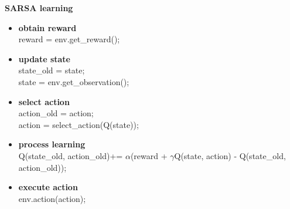 \documentclass[xcolor=dvipsnames]{beamer}
\begin{document}
\begin{frame}{\bf SARSA learning}

\begin{itemize}
  \item {\color{red} \bf obtain reward} \\
        reward = env.get\_reward();

  \item {\color{red} \bf update state} \\
        state\_old = state; \\
        state = env.get\_observation(); \\

  \item {\color{red} \bf select action} \\
        action\_old = action; \\
        action = select\_action(Q(state)); \\

  \item {\color{red} \bf process learning} \\
    Q(state\_old, action\_old)+= $\alpha$(reward + $\gamma$Q(state, action) - Q(state\_old, action\_old));

  \item {\color{red} \bf execute action} \\
    env.action(action);

\end{itemize}


\end{frame}
\end{document}
